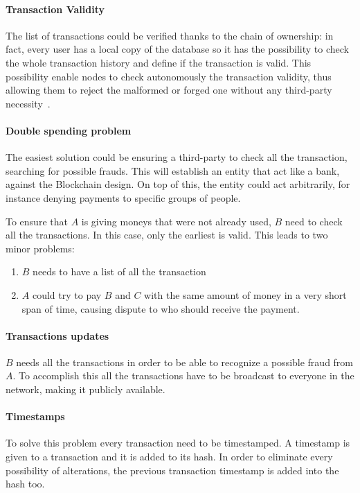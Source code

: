 \paragraph*{Transaction Validity}
The list of transactions could be verified thanks to the chain of ownership:
in fact, every user has a local copy of the database so it has the possibility
to check the whole transaction history and define if the transaction is valid.
This possibility enable nodes to check autonomously the transaction validity,
thus allowing them to reject the malformed or forged one without any
third-party necessity~\cite{nakamoto08}.

\paragraph*{Double spending problem}
The easiest solution could be ensuring a third-party to check all the
transaction, searching for possible frauds. This will establish an entity
that act like a bank, against the Blockchain design. On top of this,
the entity could act arbitrarily, for instance denying payments to specific
groups of people.

To ensure that $A$ is giving moneys that were not already used, $B$ need to
check all the transactions. In this case, only the earliest is
valid\cite{nakamoto08}. This leads to two minor problems:
\begin{enumerate}
 \item $B$ needs to have a list of all the transaction
 \item $A$ could try to pay $B$ and $C$ with the same amount of money in a very
short span of time, causing dispute to who should receive the payment.
\end{enumerate}

\paragraph*{Transactions updates}
\label{TU}
$B$ needs all the transactions in order to be able to recognize a possible
fraud from $A$. To accomplish this all the transactions have to be broadcast to
everyone in the network, making it publicly available.

\paragraph*{Timestamps}
To solve this problem every transaction need to be timestamped. A timestamp is
given to a transaction and it is added to its hash. In order to eliminate every
possibility of alterations, the previous transaction timestamp is added into
the hash too.

